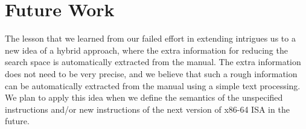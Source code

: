 \section{Future Work}
\label{sec:Future}
The lesson that we learned from our failed effort in extending \Strata
intrigues us to a new idea of a hybrid approach, where the extra information
for reducing the search space is automatically extracted from the manual.  The
extra information does not need to be very precise, and we believe that such a
rough information can be automatically extracted from the manual using a simple
text processing.  We plan to apply this idea when we define the semantics of
the unspecified instructions and/or new instructions of the next version of
x86-64 ISA in the future.
